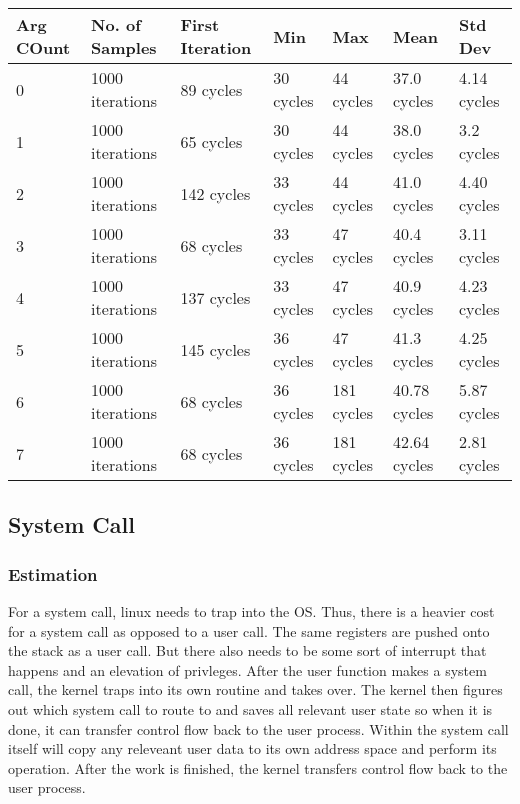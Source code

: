 \documentclass[paper=a4, fontsize=11pt]{scrartcl}
\numberwithin{equation}{section}        %
\numberwithin{figure}{section}          %
\numberwithin{table}{section}               %
\begin{document}
\begin{center}
    \begin{tabular}{ | l | l | l | l | l | l | l |}
    \hline
    Arg COunt & No. of Samples & First Iteration & Min & Max & Mean & Std Dev \\ \hline
   0 & 1000 iterations & 89 cycles & 30 cycles & 44 cycles & 37.0 cycles & 4.14 cycles \\ 
    1 &    1000 iterations & 65 cycles & 30 cycles & 44 cycles & 38.0 cycles & 3.2 cycles \\ 
     2 &       1000 iterations & 142 cycles & 33 cycles & 44 cycles & 41.0 cycles & 4.40 cycles \\ 
       3 &         1000 iterations & 68 cycles & 33 cycles & 47 cycles & 40.4 cycles & 3.11 cycles \\ 
        4 &            1000 iterations & 137 cycles & 33 cycles & 47 cycles & 40.9 cycles & 4.23 cycles \\ 
          5 &              1000 iterations & 145 cycles & 36 cycles & 47 cycles & 41.3 cycles & 4.25 cycles \\ 
             6 &               1000 iterations & 68 cycles & 36 cycles & 181 cycles & 40.78 cycles & 5.87 cycles \\ 
              7 &                  1000 iterations & 68 cycles & 36 cycles & 181 cycles & 42.64 cycles & 2.81 cycles \\ 
    \hline
    \end{tabular}
\end{center}

\subsection{System Call}

\subsubsection{Estimation}

For a system call, linux needs to trap into the OS. Thus, there is a heavier cost for a system call as opposed to a user call.  The same registers are pushed onto the stack as a user call.  But there also needs to be some sort of interrupt that happens and an elevation of privleges.  After the user function makes a system call,  the kernel traps into its own routine and takes over.  The kernel then figures out which system call to route to and saves all relevant user state so when it is done, it can transfer control flow back to the user process.  Within the system call itself will copy any releveant user data to its own address space and perform its operation.  After the work is finished, the kernel transfers control flow back to the user process.
\end{document}
